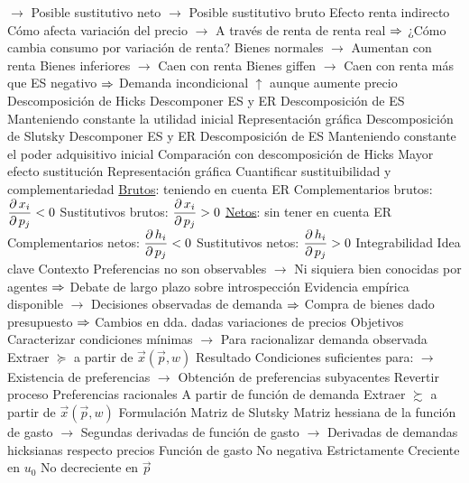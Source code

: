 \documentclass{nuevotema}
\begin{document}
\begin{esquemal}
				\4[] $\to$ Posible sustitutivo neto
				\4[] $\to$ Posible sustitutivo bruto
				\4 Efecto renta indirecto
				\4[] Cómo afecta variación del precio
				\4[] $\to$ A través de renta de renta real
				\4[] $\Rightarrow$ ¿Cómo cambia consumo por variación de renta?
				\4[] Bienes normales
				\4[] $\to$ Aumentan con renta
				\4[] Bienes inferiores
				\4[] $\to$ Caen con renta
				\4[] Bienes giffen
				\4[] $\to$ Caen con renta más que ES negativo
				\4[] $\Rightarrow$ Demanda incondicional $\uparrow$ aunque aumente precio
			\3 Descomposición de Hicks
				\4 Descomponer ES y ER
				\4 Descomposición de ES
				\4[] Manteniendo constante la utilidad inicial
				\4 Representación gráfica
				\4[] 
			\3 Descomposición de Slutsky
				\4 Descomponer ES y ER
				\4 Descomposición de ES
				\4[] Manteniendo constante el poder adquisitivo inicial
				\4 Comparación con descomposición de Hicks
				\4[] Mayor efecto sustitución
				\4 Representación gráfica
				\4[] 
			\3 Cuantificar sustituibilidad y complementariedad
				\4 \underline{Brutos}: teniendo en cuenta ER
				\4[] Complementarios brutos: $\dfrac{\partial \, x_i}{\partial \, p_j} < 0$
				\4[] Sustitutivos brutos: $\dfrac{\partial \, x_i}{\partial \, p_j} > 0$
				\4\underline{Netos}: sin tener en cuenta ER
				\4[] Complementarios netos: $\dfrac{\partial \, h_i}{\partial \, p_j} < 0$
				\4[] Sustitutivos netos: $\dfrac{\partial \, h_i}{\partial \, p_j} > 0$
		\2 Integrabilidad
			\3 Idea clave
				\4 Contexto
				\4[] Preferencias no son observables
				\4[] $\to$ Ni siquiera bien conocidas por agentes
				\4[] $\Rightarrow$ Debate de largo plazo sobre introspección
				\4[] Evidencia empírica disponible
				\4[] $\to$ Decisiones observadas de demanda
				\4[] $\Rightarrow$ Compra de bienes dado presupuesto
				\4[] $\Rightarrow$ Cambios en dda. dadas variaciones de precios
				\4 Objetivos
				\4[] Caracterizar condiciones mínimas
				\4[] $\to$ Para racionalizar demanda observada
				\4[] Extraer $\succeq$ a partir de $\vec{x}(\vec{p}, w)$
				\4 Resultado
				\4[] Condiciones suficientes para:
				\4[] $\to$ Existencia de preferencias
				\4[] $\to$ Obtención de preferencias subyacentes
				\4 Revertir proceso
				\4[] Preferencias racionales
				\4[] A partir de función de demanda
				\4[$\Rightarrow$] Extraer $\succsim$ a partir de $\vec{x}(\vec{p},w)$
			\3 Formulación
				\4 Matriz de Slutsky
				\4[] Matriz hessiana de la función de gasto
				\4[] $\to$ Segundas derivadas de función de gasto
				\4[] $\to$ Derivadas de demandas hicksianas respecto precios
				\4[i] Función de gasto
				\4[] No negativa
				\4[] Estrictamente Creciente en $u_0$
				\4[] No decreciente en $\vec{p}$

\end{esquemal}
\end{document}
